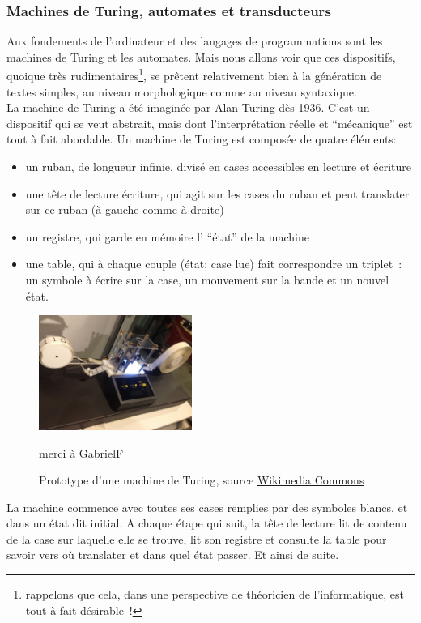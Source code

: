 \documentclass{article}
\begin{document}
			\subsubsection{Machines de Turing, automates et transducteurs}\label{automates}
				Aux fondements de l'ordinateur et des langages de programmations sont les machines de Turing et les automates. Mais nous allons voir que ces dispositifs, quoique très rudimentaires\footnote{rappelons que cela, dans une perspective de théoricien de l'informatique, est tout à fait désirable~!}, se prêtent relativement bien à la génération de textes simples, au niveau morphologique comme au niveau syntaxique.\\
				
				La machine de Turing a été imaginée par Alan Turing dès 1936. C'est un dispositif qui se veut abstrait, mais dont l'interprétation réelle et ``mécanique'' est tout à fait abordable. Un machine de Turing est composée de quatre éléments:
				\vspace{2mm}
				\begin{itemize}
					\item un ruban, de longueur infinie, divisé en cases accessibles en lecture et écriture
					\item une tête de lecture écriture, qui agit sur les cases du ruban et peut translater sur ce ruban (à gauche comme à droite)
					\item un registre, qui garde en mémoire l' ``état'' de la machine
					\item une table, qui à chaque couple (état; case lue) fait correspondre un triplet~: un symbole à écrire sur la case, un mouvement sur la bande et un nouvel état.
				\end{itemize}
				\vspace{2mm}
				\begin{figure}
					\centering
					\includegraphics[width=5cm]{turing_machine.jpg}
					\caption{Prototype d'une machine de Turing, source \href{https://commons.wikimedia.org/wiki/File:Model\_of\_a\_Turing\_machine.jpg}{Wikimedia Commons}} merci à GabrielF
				\end{figure}
				La machine commence avec toutes ses cases remplies par des symboles blancs, et dans un état dit initial. A chaque étape qui suit, la tête de lecture lit de contenu de la case sur laquelle elle se trouve, lit son registre et consulte la table pour savoir vers où translater et dans quel état passer. Et ainsi de suite.\\
\end{document}
